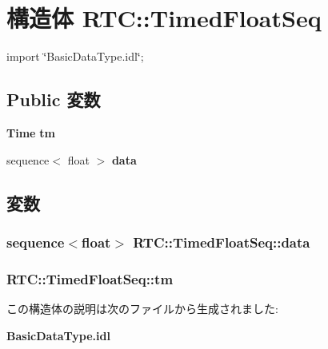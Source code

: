 \section{構造体 RTC::TimedFloatSeq}
\label{structRTC_1_1TimedFloatSeq}


{\ttfamily import \char`\"{}BasicDataType.idl\char`\"{};}

\subsection*{Public 変数}
\begin{DoxyCompactItemize}
\item 
{\bf Time} {\bf tm}
\item 
sequence$<$ float $>$ {\bf data}
\end{DoxyCompactItemize}


\subsection{変数}
\subsubsection[{data}]{\setlength{\rightskip}{0pt plus 5cm}sequence$<$float$>$ {\bf RTC::TimedFloatSeq::data}}\label{structRTC_1_1TimedFloatSeq_a797fd0ae3021d0cc9eaccdc2f12b3ad4}
\subsubsection[{tm}]{ {\bf RTC::TimedFloatSeq::tm}}\label{structRTC_1_1TimedFloatSeq_a9edda8052def84ee7da46c49c9c0bf69}


この構造体の説明は次のファイルから生成されました:\begin{DoxyCompactItemize}
\item 
{\bf BasicDataType.idl}\end{DoxyCompactItemize}
